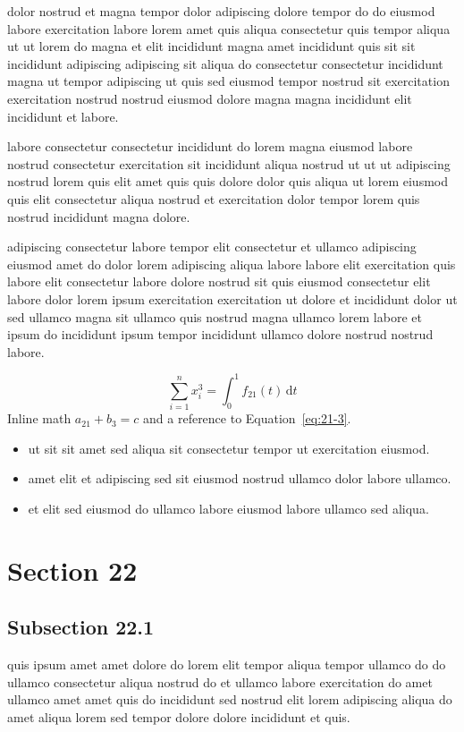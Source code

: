 \documentclass{article}
\begin{document}
dolor nostrud et magna tempor dolor adipiscing dolore tempor do do eiusmod labore exercitation labore lorem amet quis aliqua consectetur quis tempor aliqua ut ut lorem do magna et elit incididunt magna amet incididunt quis sit sit incididunt adipiscing adipiscing sit aliqua do consectetur consectetur incididunt magna ut tempor adipiscing ut quis sed eiusmod tempor nostrud sit exercitation exercitation nostrud nostrud eiusmod dolore magna magna incididunt elit incididunt et labore.

labore consectetur consectetur incididunt do lorem magna eiusmod labore nostrud consectetur exercitation sit incididunt aliqua nostrud ut ut ut adipiscing nostrud lorem quis elit amet quis quis dolore dolor quis aliqua ut lorem eiusmod quis elit consectetur aliqua nostrud et exercitation dolor tempor lorem quis nostrud incididunt magna dolore.

adipiscing consectetur labore tempor elit consectetur et ullamco adipiscing eiusmod amet do dolor lorem adipiscing aliqua labore labore elit exercitation quis labore elit consectetur labore dolore nostrud sit quis eiusmod consectetur elit labore dolor lorem ipsum exercitation exercitation ut dolore et incididunt dolor ut sed ullamco magna sit ullamco quis nostrud magna ullamco lorem labore et ipsum do incididunt ipsum tempor incididunt ullamco dolore nostrud nostrud labore.

\begin{equation}\label{eq:21-3}
  \sum_{i=1}^{n} x_i^{3} = \int_0^1 f_{21}(t)\,\mathrm{d}t
\end{equation}
Inline math $a_{21} + b_{3} = c$ and a reference to Equation~\eqref{eq:21-3}.

\begin{itemize}
  \item ut sit sit amet sed aliqua sit consectetur tempor ut exercitation eiusmod.
  \item amet elit et adipiscing sed sit eiusmod nostrud ullamco dolor labore ullamco.
  \item et elit sed eiusmod do ullamco labore eiusmod labore ullamco sed aliqua.
\end{itemize}

\section{Section 22}\label{sec:22}
\subsection{Subsection 22.1}\label{sec:22-1}
quis ipsum amet amet dolore do lorem elit tempor aliqua tempor ullamco do do ullamco consectetur aliqua nostrud do et ullamco labore exercitation do amet ullamco amet amet quis do incididunt sed nostrud elit lorem adipiscing aliqua do amet aliqua lorem sed tempor dolore dolore incididunt et quis.
\end{document}
